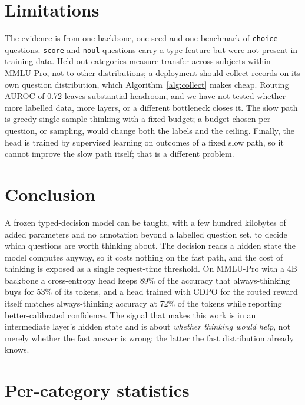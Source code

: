 \documentclass{article}
\newcommand{\cdpo}{CDPO}
\begin{document}
\section{Limitations}

The evidence is from one backbone, one seed and one benchmark of \texttt{choice} questions. \texttt{score} and \texttt{noul} questions carry a type feature but were not present in training data. Held-out categories measure transfer across subjects within MMLU-Pro, not to other distributions; a deployment should collect records on its own question distribution, which Algorithm~\ref{alg:collect} makes cheap. Routing AUROC of 0.72 leaves substantial headroom, and we have not tested whether more labelled data, more layers, or a different bottleneck closes it. The slow path is greedy single-sample thinking with a fixed budget; a budget chosen per question, or sampling, would change both the labels and the ceiling. Finally, the head is trained by supervised learning on outcomes of a fixed slow path, so it cannot improve the slow path itself; that is a different problem.

\section{Conclusion}

A frozen typed-decision model can be taught, with a few hundred kilobytes of added parameters and no annotation beyond a labelled question set, to decide which questions are worth thinking about. The decision reads a hidden state the model computes anyway, so it costs nothing on the fast path, and the cost of thinking is exposed as a single request-time threshold. On MMLU-Pro with a 4B backbone a cross-entropy head keeps 89\% of the accuracy that always-thinking buys for 53\% of its tokens, and a head trained with \cdpo{} for the routed reward itself matches always-thinking accuracy at 72\% of the tokens while reporting better-calibrated confidence. The signal that makes this work is in an intermediate layer's hidden state and is about \emph{whether thinking would help}, not merely whether the fast answer is wrong; the latter the fast distribution already knows.




\appendix
\section{Per-category statistics}
\end{document}
